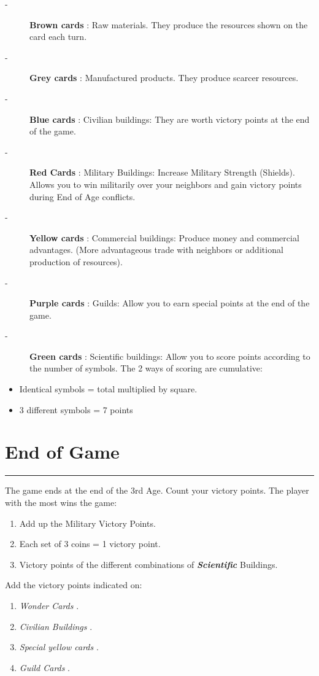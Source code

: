 \documentclass{scrartcl}%
\begin{document}
%
\begin{description}%
\item[{-} ]%
%
\textbf{Brown cards}%
: Raw materials. They produce the resources shown on the card each turn.
%
\item[{-} ]%
%
\textbf{Grey cards}%
: Manufactured products. They produce scarcer resources.
%
\item[{-} ]%
%
\textbf{Blue cards}%
: Civilian buildings: They are worth victory points at the end of the game.
%
\item[{-} ]%
%
\textbf{Red Cards}%
: Military Buildings: Increase Military Strength (Shields). Allows you to win militarily over your neighbors and gain victory points during End of Age conflicts.
%
\item[{-} ]%
%
\textbf{Yellow cards}%
: Commercial buildings: Produce money and commercial advantages. (More advantageous trade with neighbors or additional production of resources).
%
\item[{-} ]%
%
\textbf{Purple cards}%
: Guilds: Allow you to earn special points at the end of the game.
%
\item[{-} ]%
%
\textbf{Green cards}%
: Scientific buildings: Allow you to score points according to the number of symbols. The 2 ways of scoring are cumulative:
%
\end{description}%
\begin{itemize}%
\item%
%
 Identical symbols = total multiplied by square.
%
\item%
%
 3 different symbols = 7 points
%
\end{itemize}

%
\section{ End of Game
}%
\label{sec:EndofGame}%
\rule{18cm}{0.07cm}\break%
The game ends at the end of the 3rd Age. Count your victory points. The player with the most wins the game:
%
\begin{enumerate}%
\item%
%
 Add up the Military Victory Points.
%
\item%
%
 Each set of 3 coins = 1 victory point.
%
\item%
%
 Victory points of the different combinations of %
\textbf{\textit{Scientific}}%
\textit{ }%
 Buildings.
%
\end{enumerate}%
Add the victory points indicated on:
%
\begin{enumerate}%
\item%
%
\textit{Wonder Cards}%
.
%
\item%
%
\textit{Civilian Buildings}%
.
%
\item%
%
\textit{Special yellow cards}%
.
%
\item%
%
\textit{Guild Cards}%
.%
\end{enumerate}

%
\end{document}
